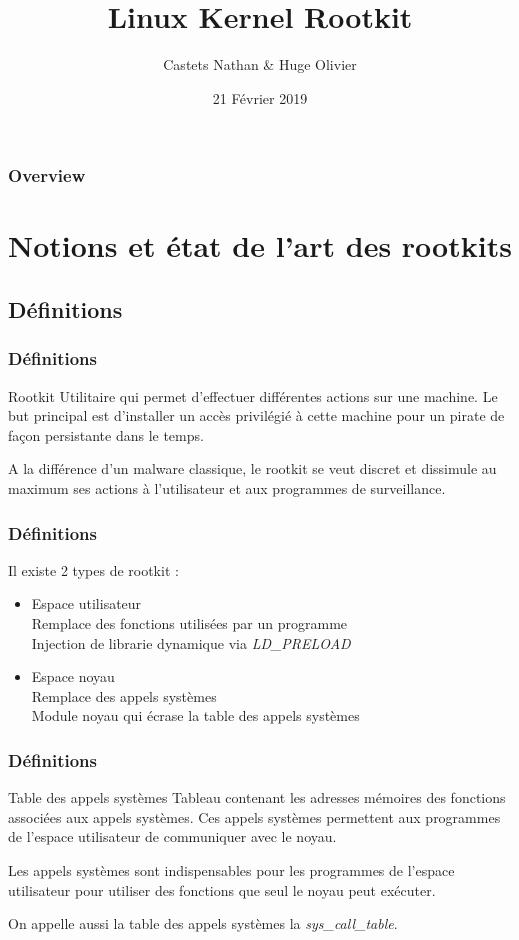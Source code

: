 \documentclass{beamer}
\title[Linux Kernel Rootkit]{Linux Kernel Rootkit}
\author{Castets Nathan \& Huge Olivier}
\institute[UBX]{Université de Bordeaux}
\date{21 Février 2019}
\begin{document}
\begin{frame}
\titlepage
\end{frame}

\begin{frame}
\frametitle{Overview}
\tableofcontents
\end{frame}

\section{Notions et état de l'art des rootkits}
\subsection{Définitions}

\begin{frame}
\frametitle{Définitions}
\begin{block}{Rootkit}
Utilitaire qui permet d'effectuer différentes actions sur une machine. Le but principal est d'installer un accès privilégié à cette machine pour un pirate de façon persistante dans le temps.
\end{block}
\medskip
A la différence d'un malware classique, le rootkit se veut discret et dissimule au maximum ses actions à l'utilisateur et aux programmes de surveillance.
\end{frame}

\begin{frame}
\frametitle{Définitions}
Il existe 2 types de rootkit :
\begin{itemize}
\item 	Espace utilisateur\\
	Remplace des fonctions utilisées par un programme\\
	Injection de librarie dynamique via \textit{LD\_PRELOAD}
\item	Espace noyau\\
	Remplace des appels systèmes\\
	Module noyau qui écrase la table des appels systèmes
\end{itemize}
\end{frame}

\begin{frame}
\frametitle{Définitions}
\begin{block}{Table des appels systèmes}
Tableau contenant les adresses mémoires des fonctions associées aux appels systèmes. Ces appels systèmes permettent aux programmes de l'espace utilisateur de communiquer avec le noyau.
\end{block}
\medskip
Les appels systèmes sont indispensables pour les programmes de l'espace utilisateur pour utiliser des fonctions que seul le noyau peut exécuter.

On appelle aussi la table des appels systèmes la \textit{sys\_call\_table}.
\end{frame}
\end{document}
